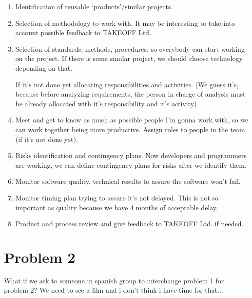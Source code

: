 \documentclass{article}
\begin{document}
\begin{enumerate}
\item Identification of reusable ‘products’/similar projects.
\item Selection of methodology to work with. It may be interesting to take into account possible feedback to TAKEOFF Ltd.
\item Selection of standards, methods, procedures, so everybody can start working on the project. If there is some similar project, we should choose technology depending on that.

If it's not done yet allocating responsibilities and activities.
(We guess it's, because before analyzing requirements, the person in charge of analysis must be already allocated with it's responsibility and it's activity)\item Meet and get to know as much as possible people I'm gonna work with, so we can work together being more productive.
 Assign roles to people in the team (if it's not done yet).
\item Risks identification and contingency plans. Now developers and programmers are working, we can define contingency plans for risks after we identify them.
\item Monitor software quality, technical results to assure the software won't fail.
\item Monitor timing plan trying to assure it's not delayed. This is not so important as quality because we have 4 months of acceptable delay.
\item Product and process review and give feedback to TAKEOFF Ltd. if needed.

\end{enumerate}


\section{Problem 2}

What if we ask to someone in spanish group to interchange problem 1 for problem 2? We need to see a film and i don't think i have time for that...
\end{document}
